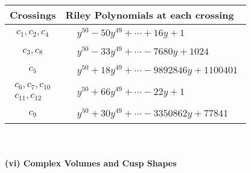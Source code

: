 \documentclass[1p]{elsarticle_modified}
\theoremstyle{definition}
\begin{document}
\begin{tabular}{m{50pt}|m{274pt}}
Crossings & \hspace{64pt}Riley Polynomials at each crossing \\
\hline $$\begin{aligned}c_{1},c_{2},c_{4}\end{aligned}$$&$\begin{aligned}
&y^{50}-50 y^{49}+\cdots+16 y+1
\end{aligned}$\\
\hline $$\begin{aligned}c_{3},c_{8}\end{aligned}$$&$\begin{aligned}
&y^{50}-33 y^{49}+\cdots-7680 y+1024
\end{aligned}$\\
\hline $$\begin{aligned}c_{5}\end{aligned}$$&$\begin{aligned}
&y^{50}+18 y^{49}+\cdots-9892846 y+1100401
\end{aligned}$\\
\hline $$\begin{aligned}c_{6},c_{7},c_{10}\\c_{11},c_{12}\end{aligned}$$&$\begin{aligned}
&y^{50}+66 y^{49}+\cdots-22 y+1
\end{aligned}$\\
\hline $$\begin{aligned}c_{9}\end{aligned}$$&$\begin{aligned}
&y^{50}+30 y^{49}+\cdots-3350862 y+77841
\end{aligned}$\\
\hline
\end{tabular}\\~\\
\newpage\flushleft \textbf{(vi) Complex Volumes and Cusp Shapes}
\end{document}
